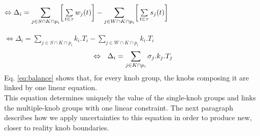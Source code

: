 \\
$\Leftrightarrow \Delta_{i}=\mathlarger{\sum\limits_{j\in S\cap K\cap p_{i}}}\bigg[\sum\limits_{t\in \tau}w_{j}(t)\bigg]-\mathlarger{\sum\limits_{j\in W\cap K\cap p_{i}}}\bigg[\sum\limits_{t\in \tau}s_{j}(t)\bigg]$\\
\\ 
$\Leftrightarrow \Delta_{i}=\sum\limits_{j\in S\cap K\cap p_{i}}k_{i}.T_{i}-\sum\limits_{j\in W\cap K\cap p_{i}}k_{i}.T_{i}$
\begin{equation}
\centering
\label{eq:balance}
\Leftrightarrow\ \ \Delta_{i}=\sum\limits_{j\in K\cap p_{i}}\sigma_{j}.k_{j}.T_{j}
\end{equation}
Eq. \ref{eq:balance} shows that, for every knob group, the knobs composing it are linked by one linear equation.\\
This equation determines uniquely the value of the single-knob groups and links the multiple-knob groups with one linear constraint. The next paragraph describes how we apply uncertainties to this equation in order to produce new, closer to reality knob boundaries.\\

